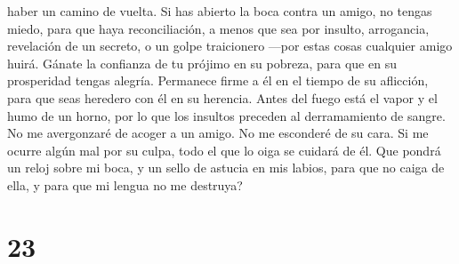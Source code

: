 haber un camino de vuelta.  Si has abierto la boca contra
un amigo, no tengas miedo, para que haya reconciliación, a menos que sea
por insulto, arrogancia, revelación de un secreto, o un golpe
traicionero ---por estas cosas cualquier amigo huirá. 
Gánate la confianza de tu prójimo en su pobreza, para que en su
prosperidad tengas alegría. Permanece firme a él en el tiempo de su
aflicción, para que seas heredero con él en su herencia. 
Antes del fuego está el vapor y el humo de un horno, por lo que los
insultos preceden al derramamiento de sangre.  No me
avergonzaré de acoger a un amigo. No me esconderé de su cara.
 Si me ocurre algún mal por su culpa, todo el que lo oiga
se cuidará de él.  Que pondrá un reloj sobre mi boca, y
un sello de astucia en mis labios, para que no caiga de ella, y para que
mi lengua no me destruya?

\hypertarget{section-22}{%
\section{23}\label{section-22}}

